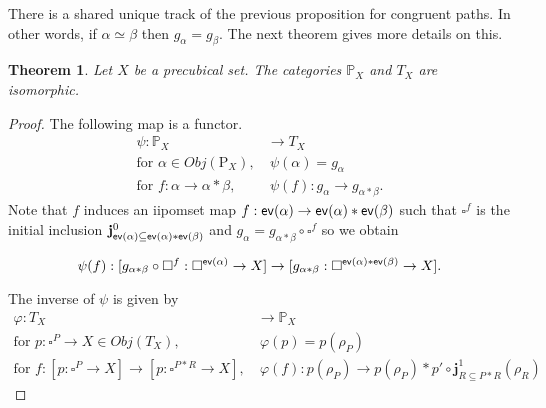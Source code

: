 \documentclass[11pt,a4paper,oldfontcommands]{memoir}
\newcommand*\ev{\textup{\textsf{ev}}}
\newcommand*\pobj[1]{\square^{#1}}
\newcommand*\jneda{\mathbf{j}}
\newtheorem{theorem}[definition]{Theorem}
\begin{document}
There is a shared unique track of the previous proposition for congruent paths. In other words, if $\alpha \simeq \beta$ then $g_{\alpha}=g_{\beta}$. The next theorem gives more details on this.
\begin{theorem}\label{th: path and tracks isomorphism}
    Let $X$ be a precubical set. The categories $\mathbb{P}_{X}$ and $T_X$ are isomorphic.
\end{theorem}
\begin{proof}
     The following map is a functor.
    \begin{align*}
        \psi: \mathbb{P}_{X} & \to  T_X \\
        \text{for } \alpha \in Obj(\mathrm{P}_{X}), & ~ \psi(\alpha)= g_{\alpha} \\
        \text{for } f:\alpha \to \alpha*\beta, &~ \psi(f): g_{\alpha}\to g_{\alpha*\beta}.
    \end{align*}
    Note that $f$ induces an iipomset map $f: \ev(\alpha) \to \ev(\alpha)*\ev(\beta) $ such that $\square^f$ is the initial inclusion $\jneda^0_{\ev(\alpha)\subseteq \ev(\alpha)*\ev(\beta)}$ and $g_{\alpha}= g_{\alpha*\beta} \circ \square^{f}$ so we obtain
    
    $$\psi(f): [g_{\alpha*\beta} \circ \square^{f} : \pobj{\ev(\alpha)} \to X] \to [g_{\alpha*\beta}: \pobj{\ev(\alpha)*\ev(\beta)} \to X].$$

    The inverse of $\psi$ is given  by
     \begin{align*}
        \varphi: T_X & \to  \mathbb{P}_{X} \\
        \text{for } p: \pobj{P}\to X \in Obj(T_X), & ~ \varphi(p)= p(\rho_P) \\
        \text{for } f: [p: \pobj{P} \to X] \to [p: \pobj{P*R} \to X], &~ \varphi(f): p(\rho_P) \to p(\rho_P)*p'\circ \jneda^1_{R\subseteq P*R}(\rho_R)
    \end{align*}


\end{proof}
\end{document}
